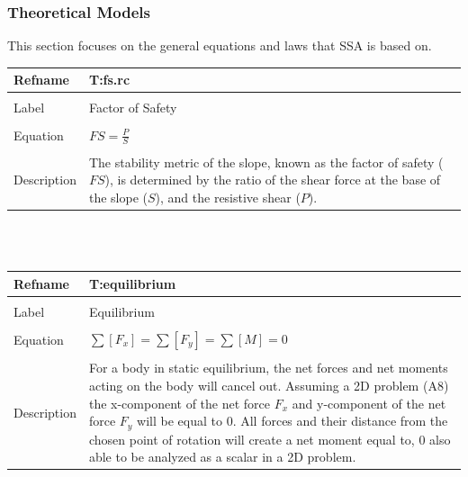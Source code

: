 \documentclass[12pt]{article}
\begin{document}
\subsubsection{Theoretical Models}
\label{Sec:TheoMode}
This section focuses on the general equations and laws that SSA is based on.
~\newline
\noindent \begin{minipage}{\textwidth}
\begin{tabular}{p{} p{}}
\toprule \textbf{Refname} & \textbf{T:fs.rc}
\label{T:fs.rc}
\\ \midrule \\
Label & Factor of Safety
\\ \midrule \\
Equation & $FS=\frac{P}{S}$
\\ \midrule \\
Description & The stability metric of the slope, known as the factor of safety ($FS$), is determined by the ratio of the shear force at the base of the slope ($S$), and the resistive shear ($P$).
\\ \bottomrule \end{tabular}
\end{minipage}\\
~\newline
\noindent \begin{minipage}{\textwidth}
\begin{tabular}{p{} p{}}
\toprule \textbf{Refname} & \textbf{T:equilibrium}
\label{T:equilibrium}
\\ \midrule \\
Label & Equilibrium
\\ \midrule \\
Equation & $\displaystyle\sum{\left[{F_{x}}\right]}=\displaystyle\sum{\left[{F_{y}}\right]}=\displaystyle\sum{\left[M\right]}=0$
\\ \midrule \\
Description & For a body in static equilibrium, the net forces and net moments acting on the body will cancel out. Assuming a 2D problem (A8) the x-component of the net force ${F_{x}}$ and y-component of the net force ${F_{y}}$ will be equal to $0$. All forces and their distance from the chosen point of rotation will create a net moment equal to, $0$ also able to be analyzed as a scalar in a 2D problem.
\\ \bottomrule \end{tabular}
\end{minipage}\\
\end{document}

